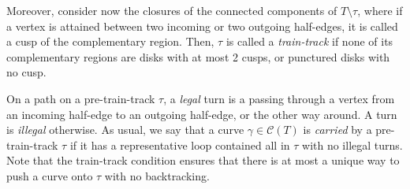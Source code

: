 \documentclass{article}
\begin{document}
	Moreover, consider now the closures of the connected components of $T\setminus \tau$, where if a vertex is attained between two incoming or two outgoing half-edges, it is called a cusp of the complementary region. Then, $\tau$ is called a \emph{train-track} if none of its complementary regions are disks with at most 2 cusps, or punctured disks with no cusp. 
	
	On a path on a pre-train-track $\tau$, a \emph{legal} turn is a passing through a vertex from an incoming half-edge to an outgoing half-edge, or the other way around. A turn is \emph{illegal} otherwise. As usual, we say that a curve $\gamma\in\mathcal{C}(T)$ is \emph{carried} by a pre-train-track $\tau$ if it has a representative loop contained all in $\tau$ with no illegal turns. Note that the train-track condition ensures that there is at most a unique way to push a curve onto $\tau$ with no backtracking.

    \finitestable*
	
\end{document}
